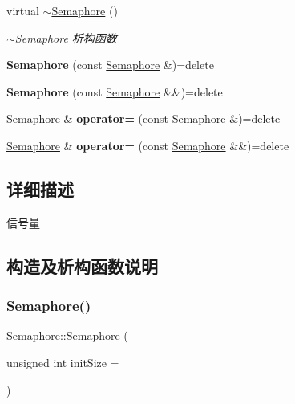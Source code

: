 \begin{DoxyCompactItemize}
virtual \hyperlink{classSemaphore_a7039839a61ed189258fb0de6338848e3}{$\sim$\+Semaphore} ()
\begin{DoxyCompactList}\small\item\em $\sim$\+Semaphore 析构函数 \end{DoxyCompactList}\item 
\mbox{\label{classSemaphore_a89fbc8358ec2936a0f90bf7144c5f02a}} 
{\bfseries Semaphore} (const \hyperlink{classSemaphore}{Semaphore} \&)=delete
\item 
\mbox{\label{classSemaphore_abd3d859134189efbc4be845048dcda24}} 
{\bfseries Semaphore} (const \hyperlink{classSemaphore}{Semaphore} \&\&)=delete
\item 
\mbox{\label{classSemaphore_a807f887093da67cb0d4ad302850b9499}} 
\hyperlink{classSemaphore}{Semaphore} \& {\bfseries operator=} (const \hyperlink{classSemaphore}{Semaphore} \&)=delete
\item 
\mbox{\label{classSemaphore_a453616a4ed5693d85c71df144999c4d3}} 
\hyperlink{classSemaphore}{Semaphore} \& {\bfseries operator=} (const \hyperlink{classSemaphore}{Semaphore} \&\&)=delete
\end{DoxyCompactItemize}


\subsection{详细描述}
信号量 

\subsection{构造及析构函数说明}
\mbox{\label{classSemaphore_a34841feb22e781d7d10ee7205f56bd8e}} 
\subsubsection{\texorpdfstring{Semaphore()}{Semaphore()}}
{\footnotesize\ttfamily Semaphore\+::\+Semaphore (\begin{DoxyParamCaption}\item[{unsigned int}]{init\+Size = {} }\end{DoxyParamCaption})\hspace{0.3cm}{\ttfamily [inline]}}



